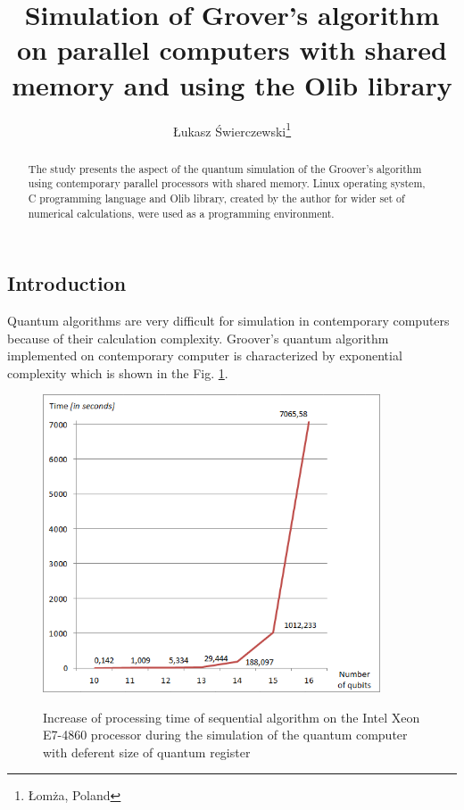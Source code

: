 \documentclass[10pt, a5paper]{article}
\begin{document}
\title{Simulation of Grover's algorithm on parallel computers with shared memory and using the Olib library}%

\author{\L{}ukasz \'{S}wierczewski\footnote{\L{}om\.z{}a, Poland}}
\maketitle

\begin{abstract}
The study presents the aspect of the quantum simulation of the Groover's algorithm using contemporary parallel processors with shared memory. Linux operating system, C programming language and Olib library, created by the author for wider set of numerical calculations, were used as a programming environment.
\end{abstract}


\subsection*{Introduction}

Quantum algorithms are very difficult for simulation in contemporary computers because of their calculation complexity. Groover's quantum algorithm implemented on contemporary computer is characterized by exponential complexity which is shown in the Fig. \ref{lf1}.

\begin{figure}
  \centering
  \includegraphics[width=10cm]{18_2012_1.png}
  \label{lf1}
  \caption{Increase of processing time of sequential algorithm on the Intel Xeon E7-4860  processor during the simulation of the quantum computer with deferent size of quantum register}
\end{figure}
\end{document}
